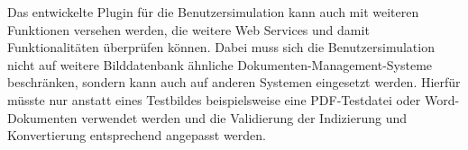 Das entwickelte Plugin für die Benutzersimulation kann auch mit weiteren Funktionen versehen werden, die weitere Web Services und damit Funktionalitäten überprüfen können.
Dabei muss sich die Benutzersimulation nicht auf weitere Bilddatenbank ähnliche Dokumenten-Management-Systeme beschränken, sondern kann auch auf anderen Systemen eingesetzt werden.
Hierfür müsste nur anstatt eines Testbildes beispielsweise eine \gls{PDF}-Testdatei oder Word-Dokumenten verwendet werden und die Validierung der Indizierung und Konvertierung entsprechend angepasst werden.


%
%
%
%

